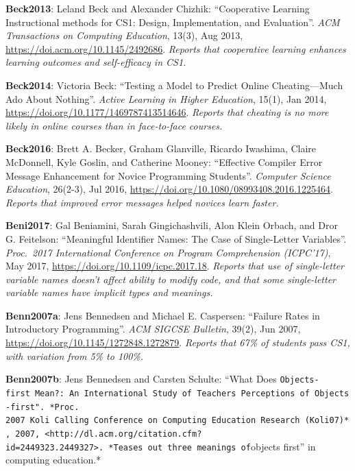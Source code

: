 \textbf{\hypertarget{b:Beck2013}{Beck2013}\label{b:Beck2013}}: Leland Beck and Alexander Chizhik: ``Cooperative Learning Instructional methods for CS1: Design, Implementation, and Evaluation''. \emph{ACM Transactions on Computing Education}, 13(3), Aug 2013, \url{https://doi.acm.org/10.1145/2492686}. \emph{Reports that cooperative learning enhances learning outcomes and self-efficacy in CS1.}

\textbf{\hypertarget{b:Beck2014}{Beck2014}\label{b:Beck2014}}: Victoria Beck: ``Testing a Model to Predict Online Cheating---Much Ado About Nothing''. \emph{Active Learning in Higher Education}, 15(1), Jan 2014, \url{https://doi.org/10.1177/1469787413514646}. \emph{Reports that cheating is no more likely in online courses than in face-to-face courses.}

\textbf{\hypertarget{b:Beck2016}{Beck2016}\label{b:Beck2016}}: Brett A. Becker, Graham Glanville, Ricardo Iwashima, Claire McDonnell, Kyle Goslin, and Catherine Mooney: ``Effective Compiler Error Message Enhancement for Novice Programming Students''. \emph{Computer Science Education}, 26(2-3), Jul 2016, \url{https://doi.org/10.1080/08993408.2016.1225464}. \emph{Reports that improved error messages helped novices learn faster.}

\textbf{\hypertarget{b:Beni2017}{Beni2017}\label{b:Beni2017}}: Gal Beniamini, Sarah Gingichashvili, Alon Klein Orbach, and Dror G. Feitelson: ``Meaningful Identifier Names: The Case of Single-Letter Variables''. \emph{Proc.\ 2017 International Conference on Program Comprehension (ICPC'17)}, May 2017, \url{https://doi.org/10.1109/icpc.2017.18}. \emph{Reports that use of single-letter variable names doesn't affect ability to modify code, and that some single-letter variable names have implicit types and meanings.}

\textbf{\hypertarget{b:Benn2007a}{Benn2007a}\label{b:Benn2007a}}: Jens Bennedsen and Michael E. Caspersen: ``Failure Rates in Introductory Programming''. \emph{ACM SIGCSE Bulletin}, 39(2), Jun 2007, \url{https://doi.org/10.1145/1272848.1272879}. \emph{Reports that 67\% of students pass CS1, with variation from 5\% to 100\%.}

\textbf{\hypertarget{b:Benn2007b}{Benn2007b}\label{b:Benn2007b}}: Jens Bennedsen and Carsten Schulte: ``What Does \texttt{Objects-first\textquotesingle{}\textquotesingle{}\ Mean?:\ An\ International\ Study\ of\ Teachers\textquotesingle{}\ Perceptions\ of\ Objects-first".\ *Proc.\\ 2007\ Koli\ Calling\ Conference\ on\ Computing\ Education\ Research\ (Koli\textquotesingle{}07)*,\ 2007,\ \textless{}http://dl.acm.org/citation.cfm?id=2449323.2449327\textgreater{}.\ *Teases\ out\ three\ meanings\ of}objects first'' in computing education.*

